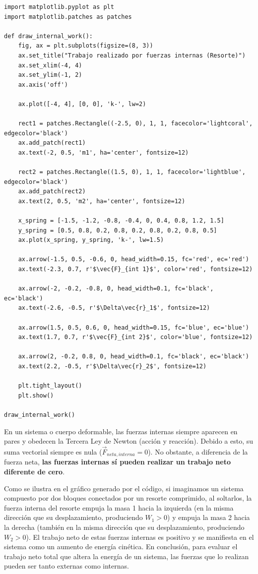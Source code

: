 \documentclass[12pt, a4paper]{article}
\begin{document}
\begin{lstlisting}
import matplotlib.pyplot as plt
import matplotlib.patches as patches

def draw_internal_work():
    fig, ax = plt.subplots(figsize=(8, 3))
    ax.set_title("Trabajo realizado por fuerzas internas (Resorte)")
    ax.set_xlim(-4, 4)
    ax.set_ylim(-1, 2)
    ax.axis('off')

    ax.plot([-4, 4], [0, 0], 'k-', lw=2)

    rect1 = patches.Rectangle((-2.5, 0), 1, 1, facecolor='lightcoral', edgecolor='black')
    ax.add_patch(rect1)
    ax.text(-2, 0.5, 'm1', ha='center', fontsize=12)

    rect2 = patches.Rectangle((1.5, 0), 1, 1, facecolor='lightblue', edgecolor='black')
    ax.add_patch(rect2)
    ax.text(2, 0.5, 'm2', ha='center', fontsize=12)

    x_spring = [-1.5, -1.2, -0.8, -0.4, 0, 0.4, 0.8, 1.2, 1.5]
    y_spring = [0.5, 0.8, 0.2, 0.8, 0.2, 0.8, 0.2, 0.8, 0.5]
    ax.plot(x_spring, y_spring, 'k-', lw=1.5)

    ax.arrow(-1.5, 0.5, -0.6, 0, head_width=0.15, fc='red', ec='red')
    ax.text(-2.3, 0.7, r'$\vec{F}_{int 1}$', color='red', fontsize=12)
        
    ax.arrow(-2, -0.2, -0.8, 0, head_width=0.1, fc='black', ec='black')
    ax.text(-2.6, -0.5, r'$\Delta\vec{r}_1$', fontsize=12)

    ax.arrow(1.5, 0.5, 0.6, 0, head_width=0.15, fc='blue', ec='blue')
    ax.text(1.7, 0.7, r'$\vec{F}_{int 2}$', color='blue', fontsize=12)
        
    ax.arrow(2, -0.2, 0.8, 0, head_width=0.1, fc='black', ec='black')
    ax.text(2.2, -0.5, r'$\Delta\vec{r}_2$', fontsize=12)

    plt.tight_layout()
    plt.show()

draw_internal_work()
\end{lstlisting}

En un sistema o cuerpo deformable, las fuerzas internas siempre aparecen en pares y obedecen la Tercera Ley de Newton (acción y reacción). Debido a esto, su suma vectorial siempre es nula ($\vec{F}_{neta, interna} = 0$). No obstante, a diferencia de la fuerza neta, \textbf{las fuerzas internas sí pueden realizar un trabajo neto diferente de cero}. 

Como se ilustra en el gráfico generado por el código, si imaginamos un sistema compuesto por dos bloques conectados por un resorte comprimido, al soltarlos, la fuerza interna del resorte empuja la masa 1 hacia la izquierda (en la misma dirección que su desplazamiento, produciendo $W_1 > 0$) y empuja la masa 2 hacia la derecha (también en la misma dirección que su desplazamiento, produciendo $W_2 > 0$). El trabajo neto de estas fuerzas internas es positivo y se manifiesta en el sistema como un aumento de energía cinética. En conclusión, para evaluar el trabajo neto total que altera la energía de un sistema, las fuerzas que lo realizan pueden ser tanto externas como internas.
\end{document}

